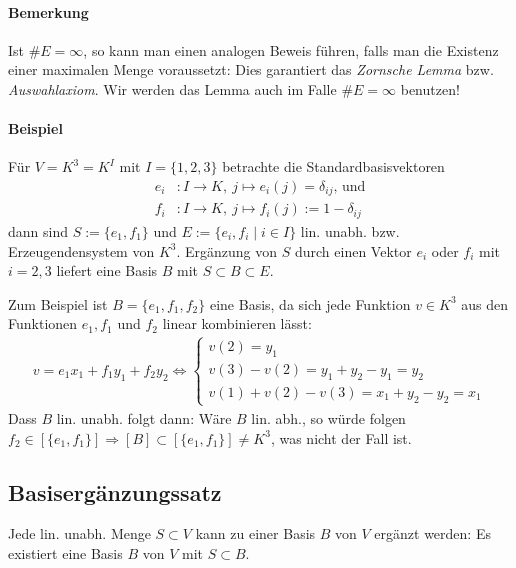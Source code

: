  	\paragraph{Bemerkung}
 		Ist $\#E = \infty$, so kann man einen analogen Beweis führen, falls man die Existenz einer maximalen Menge voraussetzt: Dies garantiert das \emph{Zornsche Lemma} bzw. \emph{Auswahlaxiom}.
 		Wir werden das Lemma auch im Falle $\#E = \infty$ benutzen!

 	\paragraph{Beispiel}
 		Für $V=K^3=K^I$ mit $I=\{1,2,3\}$ betrachte die Standardbasisvektoren
 		\begin{align*}
 			e_i & :I\to K,\ j\mapsto e_i(j) = \delta_{ij}\text{, und} \\
 			f_i & : I\to K,\ j\mapsto f_i(j):= 1-\delta_{ij}
 		\end{align*}
 		dann sind $S:= \{e_1,f_1\}$ und $E:= \{e_i,f_i\mid i\in I\}$ lin. unabh. bzw. Erzeugendensystem von $K^3$. Ergänzung von $S$ durch einen Vektor $e_i$ oder $f_i$ mit $i = 2,3$ liefert eine Basis $B$ mit $S\subset B\subset E$.

 		Zum Beispiel ist $B=\{e_1,f_1,f_2\}$ eine Basis, da sich jede Funktion $v\in K^3$ aus den Funktionen $e_1,f_1$ und $f_2$ linear kombinieren lässt:
 		\begin{gather*}
 			v=e_1x_1+f_1y_1 + f_2y_2\Leftrightarrow \left\{
 			\begin{array}{l}
 				v(2)=y_1                                   \\
 				v(3) - v(2) = y_1 + y_2 - y_1 = y_2        \\
 				v(1) + v(2) - v(3) = x_1 + y_2 - y_2 = x_1
 			\end{array}
 			\right.
 		\end{gather*}
 		Dass $B$ lin. unabh. folgt dann: Wäre $B$ lin. abh., so würde folgen $f_2\in [\{e_1,f_1\}]\Rightarrow [B] \subset [\{e_1,f_1\}] \neq K^3$, was nicht der Fall ist.

 \subsection{Basisergänzungssatz}
 	\begin{Satz}[Basisergänzungssatz]
 		Jede lin. unabh. Menge $S\subset V$ kann zu einer Basis $B$ von $V$ ergänzt werden: Es existiert eine Basis $B$ von $V$ mit $S\subset B$.
 	\end{Satz}


